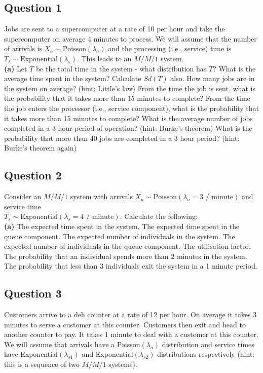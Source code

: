 \documentclass[12pt]{article}
\begin{document}
\subsection*{Question 1}
Jobs are sent to a supercomputer at a rate of 10 per hour and take the supercomputer on average 4 minutes to process. We will assume that the number of arrivals is $X_a \sim \text{Poisson}(\lambda_a)$ and the processing (i.e., service) time is $T_s \sim \text{Exponential}(\lambda_s)$. This leads to an $M/M/1$ system.\\[-0.2cm]

{\bf(a)} Let $T$ be the total time in the system - what distribution has $T$?  What is the average time spent in the system? Calculate $Sd(T)$ also.  How many jobs are in the system on average? (hint: Little's law)   From the time the job is sent, what is the probability that it takes more than 15 minutes to complete?   From the time the job enters the processor (i.e., service component), what is the probability that it takes more than 15 minutes to complete?  What is the average number of jobs completed in a 3 hour period of operation? (hint: Burke's theorem)  What is the probability that more than 40 jobs are completed in a 3 hour period? (hint: Burke's theorem again)


\subsection*{Question 2}
Consider an $M/M/1$ system with arrivals $X_a \sim \text{Poisson}(\lambda_a=3 \text{ / minute})$ and service time \\$T_s \sim \text{Exponential}(\lambda_s=4 \text{ / minute})$. Calculate the following:\\[-0.2cm]

{\bf(a)} The expected time spent in the system.  The expected time spent in the queue component.  The expected number of individuals in the system.   The expected number of individuals in the queue component.  The utilisation factor.  The probability that an individual spends more than 2 minutes in the system.  The probability that less than 3 individuals exit the system in a 1 minute period.



\subsection*{Question 3}
Customers arrive to a deli counter at a rate of 12 per hour. On average it takes 3 minutes to serve a customer at this counter. Customers then exit and head to another counter to pay. It takes 1 minute to deal with a customer at this counter. We will assume that arrivals have a Poisson$(\lambda_a)$ distribution and service times have Exponential$(\lambda_{s1})$ and Exponential$(\lambda_{s2})$ distributions respectively (hint: this is a sequence of two $M/M/1$ systems).\\[-0.2cm]
\end{document}
